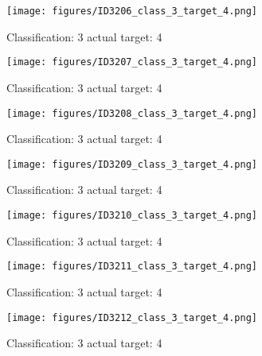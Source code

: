 \begin{figure}[h!]
\begin{center}
\texttt{[image: figures/ID3206\_class\_3\_target\_4.png]}
\end{center}
\caption{ Classification: 3 actual target: 4}
\label{fig:ID3206_class_3_target_4}
\end{figure}
\begin{figure}[h!]
\begin{center}
\texttt{[image: figures/ID3207\_class\_3\_target\_4.png]}
\end{center}
\caption{ Classification: 3 actual target: 4}
\label{fig:ID3207_class_3_target_4}
\end{figure}
\begin{figure}[h!]
\begin{center}
\texttt{[image: figures/ID3208\_class\_3\_target\_4.png]}
\end{center}
\caption{ Classification: 3 actual target: 4}
\label{fig:ID3208_class_3_target_4}
\end{figure}
\begin{figure}[h!]
\begin{center}
\texttt{[image: figures/ID3209\_class\_3\_target\_4.png]}
\end{center}
\caption{ Classification: 3 actual target: 4}
\label{fig:ID3209_class_3_target_4}
\end{figure}
\begin{figure}[h!]
\begin{center}
\texttt{[image: figures/ID3210\_class\_3\_target\_4.png]}
\end{center}
\caption{ Classification: 3 actual target: 4}
\label{fig:ID3210_class_3_target_4}
\end{figure}
\begin{figure}[h!]
\begin{center}
\texttt{[image: figures/ID3211\_class\_3\_target\_4.png]}
\end{center}
\caption{ Classification: 3 actual target: 4}
\label{fig:ID3211_class_3_target_4}
\end{figure}
\begin{figure}[h!]
\begin{center}
\texttt{[image: figures/ID3212\_class\_3\_target\_4.png]}
\end{center}
\caption{ Classification: 3 actual target: 4}
\label{fig:ID3212_class_3_target_4}
\end{figure}
